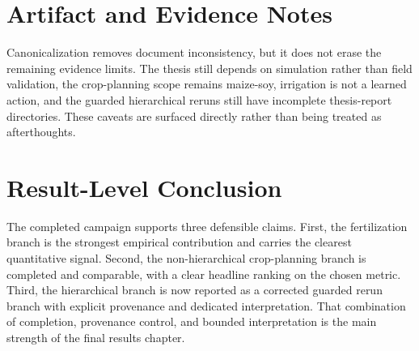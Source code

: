 \section{Artifact and Evidence Notes}

Canonicalization removes document inconsistency, but it does not erase the remaining evidence limits. The thesis still depends on simulation rather than field validation, the crop-planning scope remains maize-soy, irrigation is not a learned action, and the guarded hierarchical reruns still have incomplete thesis-report directories. These caveats are surfaced directly rather than being treated as afterthoughts.



\section{Result-Level Conclusion}

The completed campaign supports three defensible claims. First, the fertilization branch is the strongest empirical contribution and carries the clearest quantitative signal. Second, the non-hierarchical crop-planning branch is completed and comparable, with a clear headline ranking on the chosen metric. Third, the hierarchical branch is now reported as a corrected guarded rerun branch with explicit provenance and dedicated interpretation. That combination of completion, provenance control, and bounded interpretation is the main strength of the final results chapter.
